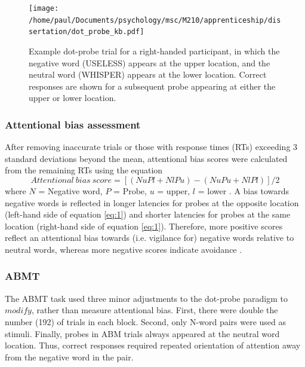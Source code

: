 \documentclass[man,floatsintext,a4paper,biblatex]{apa6}\usepackage[]{graphicx}\usepackage[]{color}
\begin{document}
\begin{figure}[!ht]
  \centering
  \texttt{[image: /home/paul/Documents/psychology/msc/M210/apprenticeship/dissertation/dot\_probe\_kb.pdf]}
  \caption{Example dot-probe trial for a right-handed participant,
  in which the negative word (\textsf{USELESS}) appears at the upper
  location, and the neutral word (\textsf{WHISPER}) appears at the
  lower location.  Correct responses are shown for a subsequent probe
  appearing at either the upper or lower location.}
  \label{fig:dotprobe}
\end{figure}

\subsubsection{Attentional bias assessment}

After removing inaccurate trials or those with response times (RTs)
exceeding 3 standard deviations beyond the mean, attentional bias scores
were calculated from the remaining RTs using the equation \begin{equation}
  Attentional\ bias\ score = [(NuPl + NlPu) - (NuPu + NlPl)]/2\label{eq:1}
\end{equation} where ${N}$ = Negative word, ${P}$ = Probe, ${u}$ =
upper, ${l}$ = lower \parencite{bradley_attentional_1997}. A bias
towards negative words is reflected in longer latencies for probes
at the opposite location (left-hand side of equation \eqref{eq:1})
and shorter latencies for probes at the same location (right-hand side
of equation \eqref{eq:1}). Therefore, more positive scores reflect an
attentional bias towards (i.e. vigilance for) negative words relative
to neutral words, whereas more negative scores indicate avoidance
\parencite{bradley_attentional_1997}.

\subsubsection{ABMT}

The ABMT task used three minor adjustments to the dot-probe paradigm to
${modify}$, rather than measure attentional bias. First, there were
double the number (192) of trials in each block. Second, only N-word
pairs were used as stimuli. Finally, probes in ABM trials always appeared
at the neutral word location. Thus, correct responses required repeated
orientation of attention away from the negative word in the pair.

\raggedbottom
\end{document}

